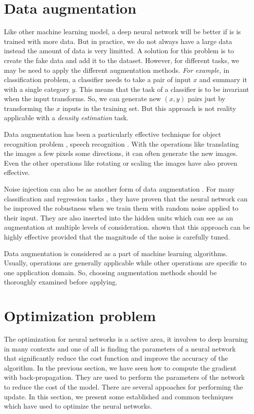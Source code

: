 \section{Data augmentation}
Like other machine learning model, a deep neural network will be better if is is trained with more data. But in practice, we do not always have a large data instead the amount of data is very limitted. A solution for this problem is to create the fake data and add it to the dataset. However, for different tasks, we may be need to apply the different augmentation methods. \textit{For example,} in classification problem, a classifier needs to take a pair of input $x$ and summary it with a single category $y$. This means that the task of a classifier is to be invariant when the input transforms. So, we can generate new $(x,y)$ pairs just by transforming the $x$ inputs in the training set. But this approach is not reality applicable with a \textit{density estimation} task.

Data augmentation has been a particularly effective technique for object recognition problem \cite{}, speech recognition \cite{}. With the operations like translating the images a few pixels some directions, it can often generate the new images. Even the other operations like rotating or scaling the images have also proven effective.

Noise injection can also be as another form of data augmentation \cite{}. For many classification and regression tasks \cite{}, they have proven that the neural network can be improved the robustness when we train them with random noise applied to their input. They are also inserted into the hidden units which can see as an augmentation at multiple levels of consideration. \cite{} shown that this approach can be highly effective provided that the magnitude of the noise is carefully tuned.

Data augmentation is considered as a part of machine learning algorithms. Usually, operations are generally applicable while other operations are specific to one application domain. So, choosing augmentation methods should be thoroughly examined before applying.

\section{Optimization problem}
The optimization for neural networks is a active area, it involves to deep learning in many contexts and one of all is finding the parameters of a neural network that significantly reduce the cost function and improve the accuracy of the algorithm. In the previous section, we have seen how to compute the gradient with back-propagation. They are used to perform the parameters of the network to reduce the cost of the model. There are several appoaches for performing the update. In this section, we present some established and common techniques which have used to optimize the neural networks.

